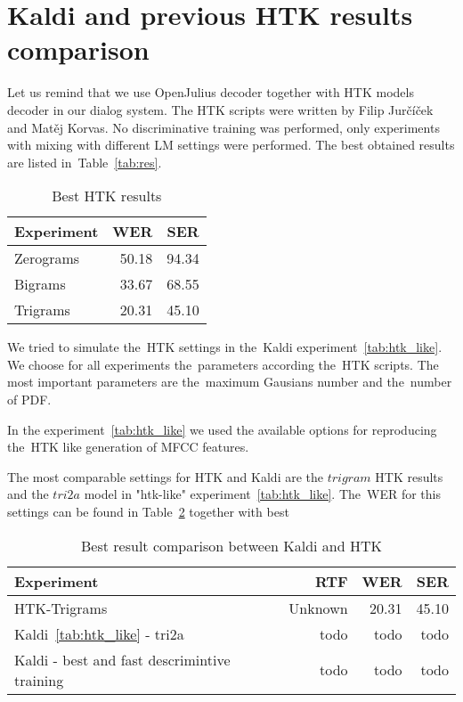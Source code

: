\clearpage


\section[Kaldi and \ac{HTK}]{Kaldi and previous \ac{HTK} results comparison} 
\label{sec:kaldi_htk}

Let us remind that we use OpenJulius decoder together with HTK models decoder in our dialog system.
The \ac{HTK} scripts were written by Filip Jurčíček and Matěj Korvas. No discriminative training was performed,
only experiments with mixing with different \acl{LM} settings were performed. 
The best obtained results are listed in~Table~\ref{tab:res}.

\begin{table}[!htp]\label{tab:htk_res}\centering\begin{tabular}{l|rr}
Experiment      & \ac{WER} & \ac{SER} \\
\hline
    Zerograms      & 50.18  & 94.34  \\
    Bigrams        & 33.67  & 68.55  \\
    Trigrams       & 20.31  & 45.10  \\
\end{tabular}
\caption{Best \ac{HTK} results}
\end{table}  

We tried to simulate the~\ac{HTK} settings in the~Kaldi experiment~\ref{tab:htk_like}.
We choose for all experiments the~parameters according the~\ac{HTK} scripts.
The most important parameters are the~maximum Gausians number and the~number of \acl{PDF}.

In the experiment~\ref{tab:htk_like} we used the available options for reproducing the~\ac{HTK} like generation
of \ac{MFCC} features.

The most comparable settings for \ac{HTK} and Kaldi are the $trigram$ \ac{HTK} results
and the $tri2a$ model in "htk-like" experiment~\ref{tab:htk_like}. 
The~\ac{WER} for this settings can be found in Table~\ref{tab:compare}
together with best 
\begin{table}[!htp]\label{tab:compare}\centering\begin{tabular}{l|rrr}
    Experiment   & \ac{RTF} & \ac{WER} & \ac{SER} \\
\hline
\hline
\ac{HTK}-Trigrams   & Unknown  & 20.31  & 45.10  \\
Kaldi~\ref{tab:htk_like} - tri2a & todo & todo   & todo \\
\hline
Kaldi - best and fast descrimintive training & todo  & todo   & todo \\
\end{tabular}
\caption{Best result comparison between Kaldi and \ac{HTK}}
\end{table}  

